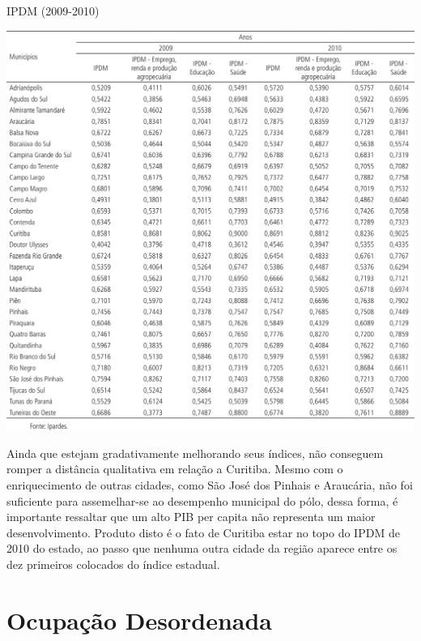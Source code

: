 	\begin{table}
		\centering
		\caption{IPDM (2009-2010)}
		\includegraphics[width=1.0\linewidth]{img/costa2015a_09}
		\label{tab:costa2015a_09}
	\end{table}
	
	Ainda que estejam gradativamente melhorando seus índices, não conseguem romper a distância qualitativa em relação a Curitiba. Mesmo com o enriquecimento de outras cidades, como São José dos Pinhais e Araucária, não foi suficiente para assemelhar-se ao desempenho municipal do pólo, dessa forma, é importante ressaltar que um alto PIB per capita não representa um maior desenvolvimento. Produto disto é o fato de Curitiba estar no topo do IPDM de 2010 do estado, ao passo que nenhuma outra cidade da região aparece entre os dez primeiros colocados do índice estadual.
	
	\section{Ocupação Desordenada}
	
